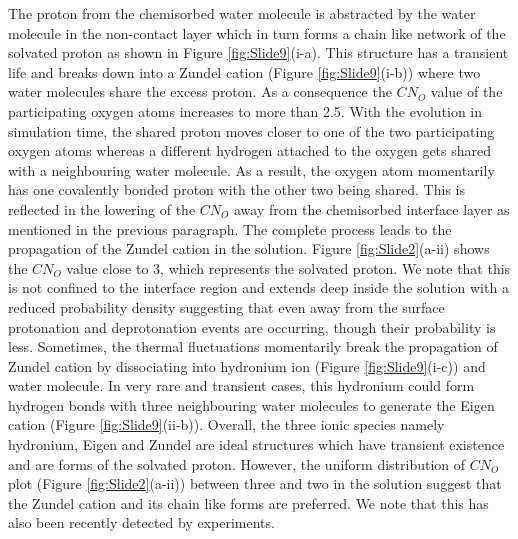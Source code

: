 The proton from the chemisorbed water molecule is abstracted by the water molecule in the non-contact layer which in turn forms a chain like network of the solvated proton as shown in Figure \ref{fig:Slide9}(i-a). This structure has a transient life and breaks down into a Zundel cation (Figure \ref{fig:Slide9}(i-b)) where two water molecules share the excess proton. As a consequence the $CN_O$ value of the participating oxygen atoms increases to more than 2.5. With the evolution in simulation
time, the shared proton moves closer to one of the two participating oxygen atoms whereas a different hydrogen attached to the oxygen gets shared with a neighbouring water molecule. As a result, the oxygen atom momentarily has one covalently bonded proton with the other two being shared. This is reflected in the lowering of the $CN_O$ away from the chemisorbed interface layer as mentioned in the previous paragraph. The complete process leads to the propagation of the Zundel cation in the solution. Figure \ref{fig:Slide2}(a-ii) shows the $CN_O$ value close to 3, which represents the solvated proton. We note that this is not confined to the interface region and extends deep inside the solution with a reduced probability density suggesting that even away from the surface protonation and deprotonation events are occurring, though their probability is less. Sometimes, the thermal fluctuations momentarily break the propagation of Zundel cation by dissociating into hydronium ion (Figure \ref{fig:Slide9}(i-c)) and water molecule. In very rare and transient cases, this hydronium could form hydrogen bonds with three neighbouring water molecules to generate the Eigen cation (Figure \ref{fig:Slide9}(ii-b)). Overall, the three ionic species namely hydronium, Eigen and Zundel are ideal structures which have transient existence\cite{marx1999nature} and are forms of the solvated proton. However, the uniform distribution of $CN_O$ plot (Figure \ref{fig:Slide2}(a-ii)) between three and two in the solution suggest that the Zundel cation and its chain like forms are preferred. We note that this has also been recently detected by experiments\cite{tian2022visualizing}.  

